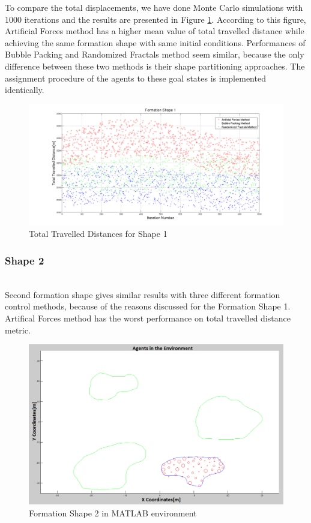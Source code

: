 To compare the total displacements, we have done Monte Carlo simulations with 1000 iterations and the results are presented in Figure \ref{total_disp_1}. According to this figure, Artificial Forces method has a higher mean value of total travelled distance while achieving the same formation shape with same initial conditions. Performances of Bubble Packing and Randomized Fractals method seem similar, because the only difference between these two methods is their shape partitioning approaches. The assignment procedure of the agents to these goal states is implemented identically. 
		
\begin{figure}[H]
\caption{Total Travelled Distances for Shape 1} \label{total_disp_1}
\centerline{\includegraphics[scale = 0.32]{Total_Energy_Shape_1}}
\end{figure} 	
				
\subsubsection{Shape 2}\hspace{0pt} \\
Second formation shape gives similar results with three different formation control methods, because of the reasons discussed for the Formation Shape 1. Artifical Forces method has the worst performance on total travelled distance metric. 

\begin{figure}[H]
\caption{Formation Shape 2 in MATLAB environment}
\centerline{\includegraphics[scale = 0.32]{Trajectories_Formation_Shape_2_2}}
\end{figure} 	
		   
